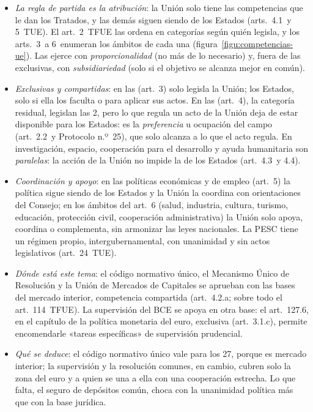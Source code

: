 \documentclass[11pt]{article}
\begin{document}
\begin{itemize}
\item \emph{La regla de partida es la atribución}: la Unión solo tiene las competencias que le dan los Tratados, y las demás siguen siendo de los Estados (arts.~4.1~y 5~TUE). El art.~2~TFUE las ordena en categorías según quién legisla, y los arts.~3~a 6~enumeran los ámbitos de cada una (figura~\ref{figu:competencias-ue}). Las ejerce con \emph{proporcionalidad} (no más de lo necesario) y, fuera de las exclusivas, con \emph{subsidiariedad} (solo si el objetivo se alcanza mejor en común).
\item \emph{Exclusivas y compartidas}: en las  (art.~3) solo legisla la Unión; los Estados, solo si ella los faculta o para aplicar sus actos. En las  (art.~4), la categoría residual, legislan las 2, pero lo que regula un acto de la Unión deja de estar disponible para los Estados: es la \emph{preferencia} u ocupación del campo (art.~2.2~y Protocolo n.º~25), que solo alcanza a lo que el acto regula. En investigación, espacio, cooperación para el desarrollo y ayuda humanitaria son \emph{paralelas}: la acción de la Unión no impide la de los Estados (art.~4.3~y 4.4).
\item \emph{Coordinación y apoyo}: en las políticas económicas y de empleo (art.~5) la política sigue siendo de los Estados y la Unión la coordina con orientaciones del Consejo; en los ámbitos del art.~6 (salud, industria, cultura, turismo, educación, protección civil, cooperación administrativa) la Unión solo apoya, coordina o complementa, sin armonizar las leyes nacionales. La PESC tiene un régimen propio, intergubernamental, con unanimidad y sin actos legislativos (art.~24~TUE).
\item \emph{Dónde está este tema}: el código normativo único, el Mecanismo Único de Resolución y la Unión de Mercados de Capitales se aprueban con las bases del mercado interior, competencia compartida (art.~4.2.a; sobre todo el art.~114~TFUE). La supervisión del BCE se apoya en otra base: el art.~127.6, en el capítulo de la política monetaria del euro, exclusiva (art.~3.1.c), permite encomendarle «tareas específicas» de supervisión prudencial.
\item \emph{Qué se deduce}: el código normativo único vale para los 27, porque es mercado interior; la supervisión y la resolución comunes, en cambio, cubren solo la zona del euro y a quien se una a ella con una cooperación estrecha. Lo que falta, el seguro de depósitos común, choca con la unanimidad política más que con la base jurídica.
\end{itemize}
\end{document}
